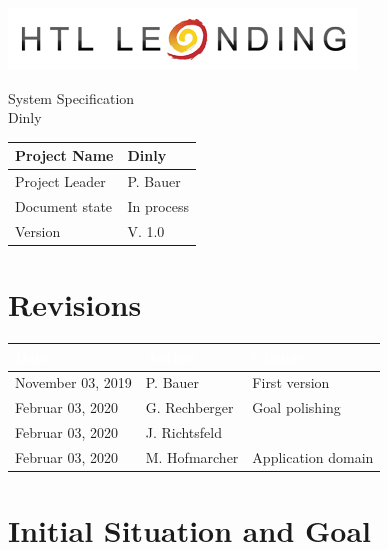 \documentclass[12pt]{article}
\theoremstyle{definition}
\newcommand{\projectname}{Dinly}
\newcommand{\productname}{Dinly}
\newcommand{\projectleader}{P. Bauer}
\newcommand{\documentstatus}{In process}
\newcommand{\version}{V. 1.0}
\begin{document}
\begin{titlepage}
\begin{flushright}
\includegraphics[scale=.5]{htlleondinglogo.png}\\
\end{flushright}

\vspace{10em}

\begin{center}
{\Huge System Specification} \\[3em]
{\LARGE \productname} \\[3em]
\end{center}

\begin{flushleft}
\begin{tabular}{|l|l|}
\hline
Project Name & \projectname \\ \hline
Project Leader & \projectleader \\ \hline
Document state & \documentstatus \\ \hline
Version & \version \\ \hline
\end{tabular}
\end{flushleft}

\end{titlepage}
\section*{Revisions}
\begin{tabular}{|l|l|l|}
\hline
\cellcolor[gray]{0.5}\textcolor{white}{Date} & \cellcolor[gray]{0.5}\textcolor{white}{Author} & \cellcolor[gray]{0.5}\textcolor{white}{Change} \\ \hline
November 03, 2019&P. Bauer&First version \\ \hline
Februar 03, 2020&G. Rechberger&Goal polishing \\ \hline
Februar 03, 2020&J. Richtsfeld& \\ \hline

Februar 03, 2020&M. Hofmarcher&Application domain \\ \hline
\end{tabular}
\pagebreak

\tableofcontents
\pagebreak

\section{Initial Situation and Goal}
\end{document}
